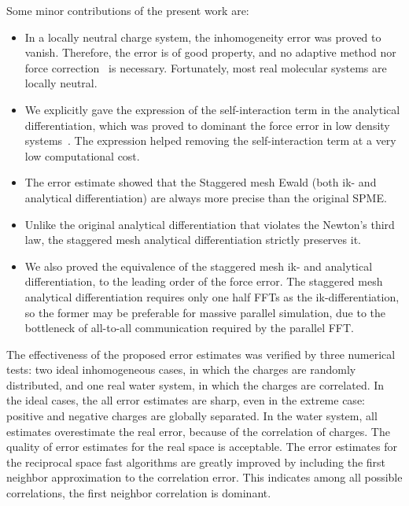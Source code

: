 \documentclass[aps,pre,preprint,unsortedaddress]{revtex4}
\begin{document}

Some minor contributions of the present work are:
\begin{itemize}
\item In a locally neutral charge system, the inhomogeneity
  error was proved to vanish. Therefore, the error
  is of good property, and no adaptive method nor
  force correction~\cite{wang2012} is necessary. Fortunately, most
  real molecular systems are locally neutral.
\item We explicitly gave the expression of the self-interaction term
  in the analytical differentiation, which was proved to dominant the
  force error in low density systems~\cite{cerutti2009staggered}.  The
  expression helped removing the self-interaction term at a very low
  computational cost.
\item The error estimate showed that the Staggered mesh Ewald
  (both ik- and analytical differentiation) are always more precise than
  the original SPME.
\item Unlike the original analytical differentiation
  that violates the Newton's third law, the staggered mesh analytical
  differentiation strictly preserves it.
\item We also proved the equivalence of the staggered mesh ik- and analytical
  differentiation, to the leading order of the force error.
  The staggered mesh analytical differentiation requires only one half
  FFTs as the ik-differentiation, so the former may be preferable
  for massive parallel simulation, due to the bottleneck of all-to-all
  communication required by the parallel FFT.
\end{itemize}

The effectiveness of the proposed error estimates was verified by
three numerical tests: two ideal inhomogeneous cases, in which the charges
are randomly distributed,
and one real water system, in which the charges are correlated.
In the ideal cases, the all error estimates are sharp, even in the extreme
case: positive and negative charges are globally separated. 
In the water system,  all estimates overestimate the real error,
because of the correlation of charges.
The quality of  error estimates for the
real space  is acceptable.
The error estimates for the reciprocal space fast algorithms
are greatly improved by including the first neighbor approximation
to the correlation error.
This indicates among all possible correlations, the first
neighbor correlation is dominant.
\end{document}
